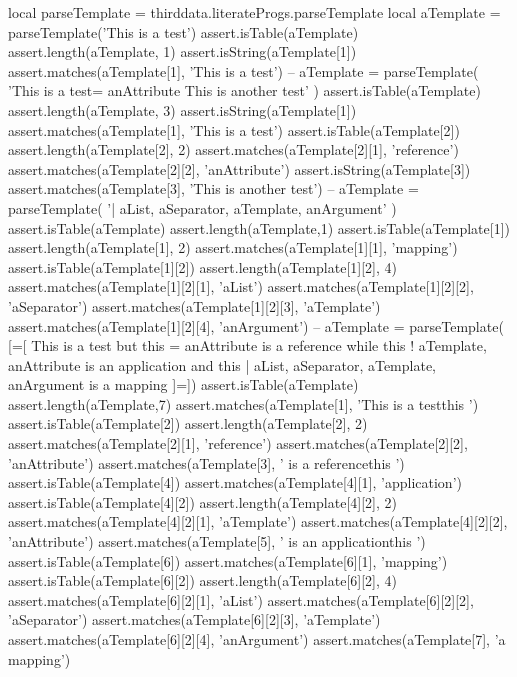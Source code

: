 {{\startLuaTest
local parseTemplate = thirddata.literateProgs.parseTemplate
local aTemplate = parseTemplate('This is a test')
assert.isTable(aTemplate)
assert.length(aTemplate, 1)
assert.isString(aTemplate[1])
assert.matches(aTemplate[1], 'This is a test')
--
aTemplate = parseTemplate(
  'This is a test{{=  anAttribute  }}This is another test'
)
assert.isTable(aTemplate)
assert.length(aTemplate, 3)
assert.isString(aTemplate[1])
assert.matches(aTemplate[1], 'This is a test')
assert.isTable(aTemplate[2])
assert.length(aTemplate[2], 2)
assert.matches(aTemplate[2][1], 'reference')
assert.matches(aTemplate[2][2], 'anAttribute')
assert.isString(aTemplate[3])
assert.matches(aTemplate[3], 'This is another test')
--
aTemplate = parseTemplate(
  '{{| aList, aSeparator, aTemplate, anArgument}}'
)
assert.isTable(aTemplate)
assert.length(aTemplate,1)
assert.isTable(aTemplate[1])
assert.length(aTemplate[1], 2)
assert.matches(aTemplate[1][1], 'mapping')
assert.isTable(aTemplate[1][2])
assert.length(aTemplate[1][2], 4)
assert.matches(aTemplate[1][2][1], 'aList')
assert.matches(aTemplate[1][2][2], 'aSeparator')
assert.matches(aTemplate[1][2][3], 'aTemplate')
assert.matches(aTemplate[1][2][4], 'anArgument')
--
aTemplate = parseTemplate(
[=[
This is a test
but this {{= anAttribute }} is a reference
while this {{! aTemplate, anAttribute }} is an application
and this {{| aList, aSeparator, aTemplate, anArgument }}
is a mapping
]=])
assert.isTable(aTemplate)
assert.length(aTemplate,7)
assert.matches(aTemplate[1], 'This is a test\nbut this ')
assert.isTable(aTemplate[2])
assert.length(aTemplate[2], 2)
assert.matches(aTemplate[2][1], 'reference')
assert.matches(aTemplate[2][2], 'anAttribute')
assert.matches(aTemplate[3], ' is a reference\nwhile this ')
assert.isTable(aTemplate[4])
assert.matches(aTemplate[4][1], 'application')
assert.isTable(aTemplate[4][2])
assert.length(aTemplate[4][2], 2)
assert.matches(aTemplate[4][2][1], 'aTemplate')
assert.matches(aTemplate[4][2][2], 'anAttribute')
assert.matches(aTemplate[5], ' is an application\nand this ')
assert.isTable(aTemplate[6])
assert.matches(aTemplate[6][1], 'mapping')
assert.isTable(aTemplate[6][2])
assert.length(aTemplate[6][2], 4)
assert.matches(aTemplate[6][2][1], 'aList')
assert.matches(aTemplate[6][2][2], 'aSeparator')
assert.matches(aTemplate[6][2][3], 'aTemplate')
assert.matches(aTemplate[6][2][4], 'anArgument')
assert.matches(aTemplate[7], '\nis a mapping\n')
\stopLuaTest
\stopTestCase

\stopTestSuite

\startTestSuite[addTemplate]

}}
